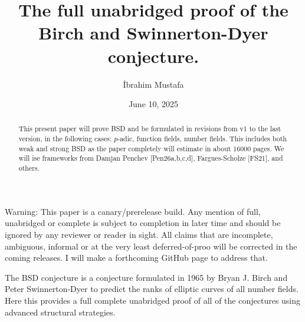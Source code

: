 \documentclass[9pt]{amsart}
\title[Proof of BSD]{The full unabridged proof of the Birch and Swinnerton-Dyer conjecture.}
\author{İbrahim Mustafa}
\date{June 10, 2025}
\renewcommand{\[}{\begin{equation}}
\renewcommand{\]}{\end{equation}}
\theoremstyle{plain}
\theoremstyle{remark}
\begin{document}
Warning: This paper is a canary/prerelease build. Any mention of full, unabridged or complete is subject to completion in later time and should be ignored by any reviewer or reader in sight. All claims that are incomplete, ambiguous, informal or at the very least deferred-of-proo will be corrected in the coming releases. I will make a forthcoming GitHub page to address that.
\begin{abstract}
This present paper will prove BSD and be formulated in revisions from v1 to the last version, in the following cases: $p$-adic, function fields, number fields. This includes both weak and strong BSD as the paper completely will estimate in about 16000 pages. We will ise frameworks from Damjan Penchev [Pen26a,b,c,d], Fargues-Scholze [FS21], and others.
\end{abstract}
\maketitle The BSD conjecture is a conjecture formulated in 1965 by Bryan J. Birch and Peter Swinnerton-Dyer to predict the ranks of elliptic curves of all number fields. Here this provides a full complete unabridged proof of all of the conjectures using advanced structural strategies.
\end{document}
